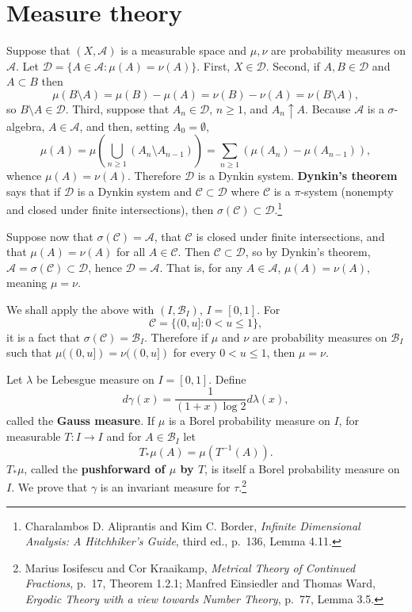 \documentclass{article}
\theoremstyle{definition}
\theoremstyle{definition}
\begin{document}
\section{Measure theory}
Suppose that $(X,\mathscr{A})$ is a measurable space and $\mu,\nu$ are probability measures on $\mathscr{A}$.
Let
$\mathscr{D} = \{A \in \mathscr{A}: \mu(A)=\nu(A)\}$. 
First, $X \in \mathscr{D}$.  Second, if $A,B \in \mathscr{D}$ and $A \subset B$ then
\[
\mu(B \setminus A) = \mu(B)-\mu(A) = \nu(B)-\nu(A) = \nu(B \setminus A),
\]
so $B \setminus A \in \mathscr{D}$. Third,
suppose that $A_n \in \mathscr{D}$, $n \geq 1$, and $A_n \uparrow A$. Because $\mathscr{A}$ is a $\sigma$-algebra, $A \in \mathscr{A}$,
and then, setting $A_0 = \emptyset$,
\[
\mu(A) = \mu\left( \bigcup_{n \geq 1} (A_n \setminus A_{n-1}) \right) = \sum_{n \geq 1} (\mu(A_n)-\mu(A_{n-1})),
\]
whence $\mu(A)=\nu(A)$. Therefore $\mathscr{D}$ is a Dynkin system. 
\textbf{Dynkin's theorem} says that if $\mathscr{D}$ is a Dynkin system and
$\mathscr{C} \subset \mathscr{D}$ where $\mathscr{C}$ is a $\pi$-system (nonempty and closed under finite intersections),
then $\sigma(\mathscr{C}) \subset \mathscr{D}$.\footnote{Charalambos D. Aliprantis and Kim C. Border,
{\em Infinite Dimensional Analysis: A Hitchhiker's Guide},
third ed., p.~136, Lemma 4.11.}


Suppose now that $\sigma(\mathscr{C})=\mathscr{A}$, that
$\mathscr{C}$ is closed under finite intersections,
and that $\mu(A)=\nu(A)$ for all $A \in \mathscr{C}$.
Then $\mathscr{C} \subset \mathscr{D}$, so by Dynkin's theorem,
$\mathscr{A} =\sigma(\mathscr{C}) \subset \mathscr{D}$, hence
$\mathscr{D}=\mathscr{A}$. That is, for any $A \in \mathscr{A}$, $\mu(A)=\nu(A)$, meaning $\mu=\nu$. 

We shall apply the above  with $(I,\mathscr{B}_I)$, $I=[0,1]$. For
\[
\mathscr{C} = \{(0,u]: 0<u \leq 1\},
\]
it is a fact that
$\sigma(\mathscr{C})=\mathscr{B}_I$. Therefore if $\mu$ and $\nu$ are probability measures on
$\mathscr{B}_I$ such that $\mu((0,u])=\nu((0,u])$ for every $0<u \leq 1$, then
$\mu=\nu$. 


Let $\lambda$ be Lebesgue measure on $I=[0,1]$. Define
\[
d\gamma(x) = \frac{1}{(1+x)\log 2} d\lambda(x),
\]
called the \textbf{Gauss measure}. 
If $\mu$ is a Borel probability measure on $I$,
for measurable $T:I \to I$ and
for $A \in \mathscr{B}_I$ let
\[
T_* \mu (A) = \mu(T^{-1}(A)).
\]
$T_*\mu$, called the \textbf{pushforward of $\mu$ by $T$}, is itself a Borel probability measure on $I$. 
We prove that $\gamma$ is an invariant measure for $\tau$.\footnote{Marius Iosifescu and Cor Kraaikamp,
{\em Metrical Theory of Continued Fractions}, p.~17, Theorem 1.2.1;
Manfred Einsiedler and Thomas Ward, {\em Ergodic Theory with a view towards Number Theory}, 
p.~77, Lemma 3.5.}
\end{document}
